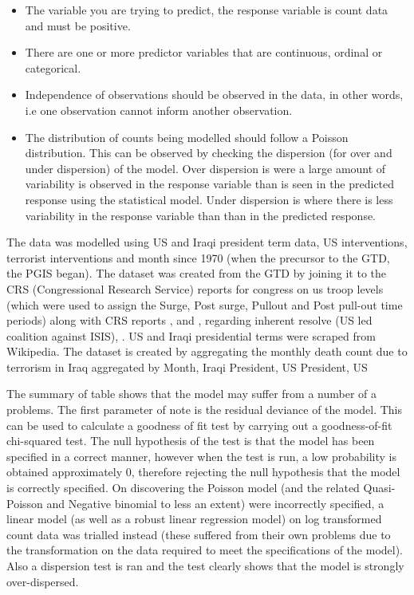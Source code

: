 \begin{itemize}
\item The variable you are trying to predict, the response variable is count data and must be positive.
\item There are one or more predictor variables that are continuous, ordinal or categorical.
\item Independence of observations should be observed in the data, in other words, i.e one observation cannot inform another observation.
\item The distribution of counts being modelled should follow a Poisson distribution. This can be observed by checking the dispersion (for over and under dispersion) of the model. Over dispersion is  were a large amount of variability is observed in the response variable than is seen in the predicted response using the statistical model. Under dispersion is where there is less variability in the response variable than than in the predicted response.
\end{itemize}

The data was modelled using US and Iraqi president term data, US interventions, terrorist interventions and month since 1970 (when the precursor to the GTD, the PGIS began). 
The dataset was created from the GTD by joining it to the CRS (Congressional Research Service) reports for congress on us troop levels (which were used to assign the Surge, Post surge, Pullout and Post pull-out time periods) along with CRS reports \citep{peters2016department}, \citep{belasco2009troop} and \citep{o2007us}, regarding inherent resolve (US led coalition against ISIS), \citep{fischer2015guide}. US and Iraqi presidential terms were scraped from Wikipedia. The dataset is created by aggregating the monthly death count due to terrorism in Iraq aggregated by Month, Iraqi President, US President, US

The summary of table  shows that the model may suffer from a number of a problems. The first parameter of note is the residual deviance of the model. This can be used to calculate a goodness of fit test by carrying out a goodness-of-fit chi-squared test. The null hypothesis of the test is that the model has been specified in a correct manner, however when the test is run,  a low probability is obtained  approximately 0, therefore rejecting the null hypothesis that the model is correctly specified. On discovering the Poisson model (and the related Quasi-Poisson and Negative binomial to less an extent) were incorrectly specified, a linear model (as well as a robust linear regression model) on log transformed count data was trialled instead (these suffered from their own problems due to the transformation on the data required to meet the specifications of the model). Also a dispersion test is ran and the test clearly shows that the model is strongly over-dispersed.

